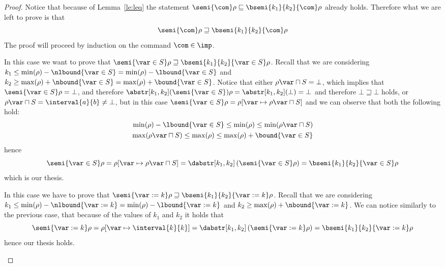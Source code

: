 \begin{proof}
  Notice that because of Lemma~\ref{le:leq} the statement
  \({\semi{\com}\rho} \sqsubseteq {\bsemi{k_1}{k_2}{\com}\rho}\)
  already holds. Therefore what we are left to prove is that
  \begin{equation*}
    \semi{\com}\rho \sqsupseteq \bsemi{k_1}{k_2}{\com}\rho
  \end{equation*}
  The proof will proceed by induction on the command \(\com\in\imp\).
  \begin{inductive}
     In this case we want to prove that
    \({\semi{\var\in S}\rho \sqsupseteq
      \bsemi{k_1}{k_2}{\var\in S}\rho}\). Recall that we are
    considering
    \({k_1 \leq \min(\rho) - \nlbound{\var\in S}} = {\min(\rho) -
      \lbound{\var\in S}}\) and
    \({k_2 \geq \max(\rho) + \nbound{\var\in S}} = {\max(\rho) +
      \bound{\var\in S}}\). Notice that either
    \(\rho\var \sqcap S = \bot\), which implies that
    \(\semi{\var\in S}\rho = \bot\), and therefore
    \({\abstr[k_1,k_2](\semi{\var\in S})\rho} =
    \abstr[k_1,k_2](\bot) = \bot\) and therefore
    \(\bot \sqsupseteq \bot\) holds, or
    \(\rho\var \sqcap S = \interval{a}{b} \neq \bot\), but in this
    case
    \({\semi{\var\in S}\rho} = {\rho[\var \mapsto \rho\var
      \sqcap S]}\) and we can observe that both the following hold:
    \begin{align*}
      \min(\rho) - \lbound{\var\in S} \leq \min(\rho) \leq \min(\rho\var \sqcap S) \\
      \max(\rho\var \sqcap S) \leq \max(\rho) \leq \max(\rho) + \bound{\var\in S}
    \end{align*}
    hence
    \begin{equation*}
      \semi{\var\in S}\rho = \rho[\var \mapsto \rho\var \sqcap S] = \dabstr[k_1,k_2]\left(\semi{\var\in S}\rho\right) = \bsemi{k_1}{k_2}{\var\in S}\rho
    \end{equation*}
    which is our thesis.
    
     In this case we have to prove that
    \(\semi{\var := k}\rho \sqsupseteq
    \bsemi{k_1}{k_2}{\var := k}\rho\). Recall that we are
    considering
    \({k_1 \leq \min(\rho) - \nlbound{\var := k}} = {\min(\rho) -
      \lbound{\var := k}}\) and
    \({k_2 \geq \max(\rho) + \nbound{\var := k}}\).  We can notice
    similarly to the previous case, that because of the values of
    \(k_1\) and \(k_2\) it holds that
    \begin{equation*}
      \semi{\var := k}\rho = \rho[\var \mapsto \interval{k}{k}] = \dabstr[k_1,k_2]\left(\semi{\var := k}\rho\right) = \bsemi{k_1}{k_2}{\var := k}\rho
    \end{equation*}
    hence our thesis holds.
    

\end{inductive}
\end{proof}
